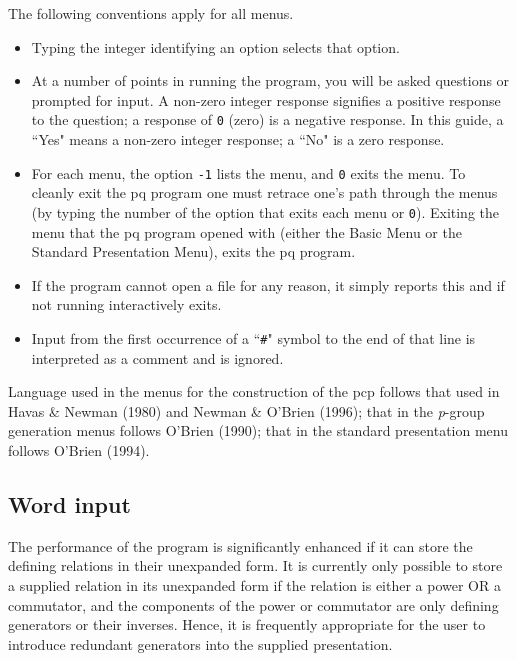 \documentclass[12pt]{article}
\begin{document}
The following conventions apply for all menus.
\begin{itemize}
\item 
Typing the integer identifying an option selects that option.

\item 
At a number of points in running the program, you will
be asked questions or prompted for input. A non-zero integer response
signifies a positive response to the question; a response of \texttt{0} (zero)
is a negative response.
In this guide, a ``Yes" means a non-zero integer response;
a ``No" is a zero response.

\item 
For each menu, the option \texttt{-1} lists the menu,
and \texttt{0} exits the menu.
To cleanly exit the pq program one must retrace one's path through the menus
(by typing the number of the option that exits each menu or \texttt{0}).
Exiting the menu that the pq program opened with (either the Basic Menu
or the Standard Presentation Menu), exits the pq program.

\item If the program cannot open a file for any reason, it simply 
reports this and if not running interactively exits.

\item Input from the first occurrence of a ``\texttt{\#}" symbol to the 
      end of that line is interpreted as a comment and is ignored. 
\end{itemize}

Language used in the menus for the construction of the pcp 
follows that used in Havas \& Newman (1980) and 
Newman \& O'Brien (1996);
that in the {\it p}-group generation menus follows O'Brien (1990);
that in the standard presentation menu follows O'Brien (1994).

\subsection{Word input}\label{sec:word-input}

The performance of the program is significantly enhanced if 
it can store the defining relations in their unexpanded form.
It is currently only possible to store a supplied relation in its
unexpanded form if the relation is either a power OR a commutator, 
and the components of the power or commutator are only
defining generators or their inverses. Hence, it is frequently 
appropriate for the user to introduce redundant generators into 
the supplied presentation. 
\end{document}
